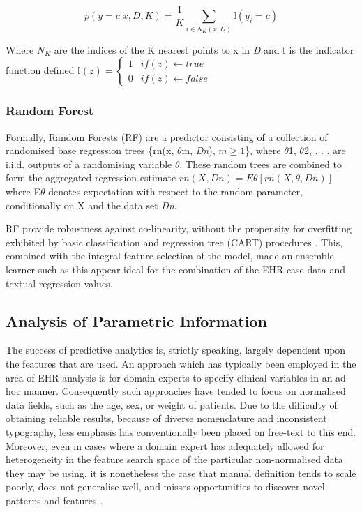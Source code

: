 \begin{equation}
p(y = c|x,D,K) = \frac{1}{K}  \sum_{i \in N_K(x,D)} \mathbb{I}(y_{i}=c)
\end{equation}

Where $N_K$ are the indices of the K nearest points to x in \textit{D} and $\mathbb{I}$ is the indicator function defined
$
\mathbb{I}(z) = \left\{\begin{matrix}
 1 & if (z) \leftarrow true\\ 
 0 & if (z) \leftarrow false
\end{matrix}\right.
$


 \subsubsection{Random Forest}

Formally, Random Forests (RF) are a predictor consisting of a collection of randomised
base regression trees \{rn(x, $\theta$m, \textit{Dn}), $m \geq 1$\}, where $\theta$1, $\theta$2, . . . are i.i.d.
outputs of a randomising variable $\theta$. These random trees are combined to
form the aggregated regression estimate
$\overline r$$n(X, Dn) = E\theta [rn(X, \theta, Dn)] $
where E$\theta$ denotes expectation with respect to the random parameter, conditionally
on X and the data set \textit{Dn}.

RF provide robustness against co-linearity, without the propensity for overfitting exhibited by basic classification and regression tree (CART) procedures \cite{hayes2015using}. This, combined with the integral feature selection of the model, made an ensemble learner such as this appear ideal for the combination of the EHR case data and textual regression values.
 
   \subsection{Analysis of Parametric Information }
 \label{Parametric_information}
 




 The success of predictive analytics is, strictly speaking, largely dependent upon the features that are used. An approach which has typically been employed in the area of EHR analysis is for domain experts to specify clinical variables in an ad-hoc manner. Consequently such approaches have tended to focus on normalised data fields, such as the age, sex, or weight of patients. Due to the difficulty of obtaining reliable results, because of diverse nomenclature and inconsistent typography, less emphasis has conventionally been placed on free-text to this end. Moreover, even in cases where a domain expert has adequately allowed for heterogeneity in the feature search space of the particular non-normalised data they may be using, it is nonetheless the case that manual definition tends to scale poorly, does not generalise well, and misses opportunities to discover novel patterns and features \cite{miotto2016deep}. 
 
